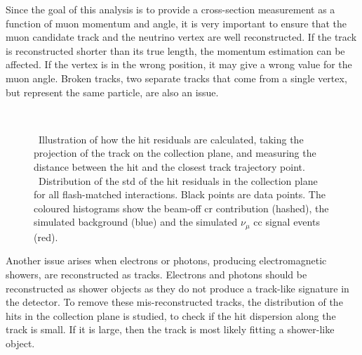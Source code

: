 Since the goal of this analysis is to provide a cross-section measurement as a function of muon momentum and angle, it is very important to ensure that the muon candidate track and the neutrino vertex are well reconstructed. If the track is reconstructed shorter than its true length, the momentum estimation can be affected. If the vertex is in the wrong position, it may give a wrong value for the muon angle.
Broken tracks, two separate tracks that come from a single vertex, but represent the same particle, are also an issue.
%
\begin{figure}[]
\centering
{}\quad\quad
{} \\ 
\caption[Distribution of Hit Residuals]{\protect{}~Illustration of how the hit residuals are calculated, taking the projection of the track on the collection plane, and measuring the distance between the hit and the closest track trajectory point. \protect{}~Distribution of the \acrshort{std} of the hit residuals in the collection plane for all flash-matched interactions. Black points are data points. The coloured histograms show the beam-off \acrshort{cr} contribution (hashed), the simulated background (blue) and the simulated $\nu_\mu$ \acrshort{cc} signal events (red).}
\label{fig:aa_trk_quality_residuals}
\end{figure}
%
Another issue arises when electrons or photons, producing electromagnetic showers, are reconstructed as tracks. Electrons and photons should be reconstructed as shower objects as they do not produce a track-like signature in the detector. To remove these mis-reconstructed tracks, the distribution of the hits in the collection plane is studied, to check if the hit dispersion along the track is small. If it is large, then the track is most likely fitting a shower-like object. 
